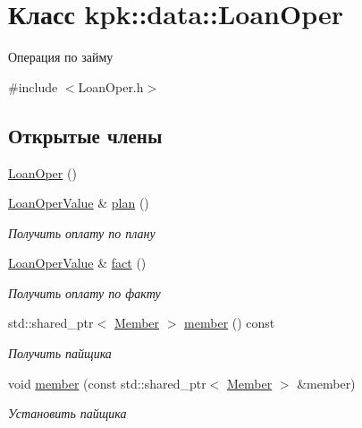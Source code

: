 \hypertarget{classkpk_1_1data_1_1_loan_oper}{}\section{Класс kpk\+:\+:data\+:\+:Loan\+Oper}
\label{classkpk_1_1data_1_1_loan_oper}


Операция по займу  




{\ttfamily \#include $<$Loan\+Oper.\+h$>$}

\subsection*{Открытые члены}
\begin{DoxyCompactItemize}
\item 
\hyperlink{classkpk_1_1data_1_1_loan_oper_ab4c52cd423192f6d8a14bac56917e8cb}{Loan\+Oper} ()
\item 
\hyperlink{classkpk_1_1data_1_1_loan_oper_value}{Loan\+Oper\+Value} \& \hyperlink{classkpk_1_1data_1_1_loan_oper_af20e426695913f8593131a65014b29b4}{plan} ()
\begin{DoxyCompactList}\small\item\em Получить оплату по плану \end{DoxyCompactList}\item 
\hyperlink{classkpk_1_1data_1_1_loan_oper_value}{Loan\+Oper\+Value} \& \hyperlink{classkpk_1_1data_1_1_loan_oper_afab5ad2be6f0207bce3c61e2b6ea8f40}{fact} ()
\begin{DoxyCompactList}\small\item\em Получить оплату по факту \end{DoxyCompactList}\item 
std\+::shared\+\_\+ptr$<$ \hyperlink{classkpk_1_1data_1_1_member}{Member} $>$ \hyperlink{classkpk_1_1data_1_1_loan_oper_a18b2bace5fa76d8fe05e275edd88b604}{member} () const 
\begin{DoxyCompactList}\small\item\em Получить пайщика \end{DoxyCompactList}\item 
void \hyperlink{classkpk_1_1data_1_1_loan_oper_af5ac012ec26a5380d0df9ed2f263c8cd}{member} (const std\+::shared\+\_\+ptr$<$ \hyperlink{classkpk_1_1data_1_1_member}{Member} $>$ \&member)
\begin{DoxyCompactList}\small\item\em Установить пайщика \end{DoxyCompactList}\item 

\end{DoxyCompactItemize}
